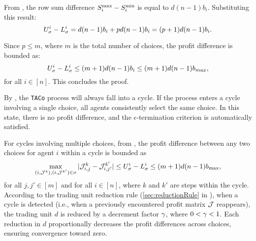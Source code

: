 \begin{customproof}
From , the row sum difference $S_i^{\mathrm{max}} - S_i^{\mathrm{min}}$ is equal to $d(n-1)b_i$. Substituting this result:
\begin{equation} \label{eq:priceDiff}
U_\sigma^i - L_\sigma^i = d(n-1)b_i + p d(n-1)b_i = (p+1)d(n-1)b_i.
\end{equation}

Since $p \leq m$, where $m$ is the total number of choices, the profit difference is bounded as:
\begin{equation} \label{eq:priceDiffUpper}
U_\sigma^i - L_\sigma^i \leq (m+1)d(n-1)b_i \leq (m+1)d(n-1)b_{max},
\end{equation}
for all $i\in[n]$. This concludes the proof.
\end{customproof}

\begin{customproof}
By , the \texttt{TACo} process will always fall into a cycle. If the process enters a cycle involving a single choice, all agents consistently select the same choice.  In this state, there is no profit difference, and the $\epsilon$-termination criterion is automatically satisfied. 

For cycles involving multiple choices, from , the profit difference between any two choices for agent $i$ within a cycle is bounded as
\begin{equation} \label{eq:profitBound}
\max_{(i,\mathcal{J}^k),(i,\mathcal{J}^{k'})\in\sigma} |\mathcal{J}^k_{i, j} - \mathcal{J}^{k'}_{i, j'}| \leq U_\sigma^i - L_\sigma^i \leq (m+1)d(n-1)b_{\max},
\end{equation}
for all $j, j' \in [m]$ and for all $i \in [n]$, where $k$ and $k'$ are steps within the cycle. According to the trading unit reduction rule (\cref{sec:reductionRule} in ), when a cycle is detected (i.e., when a previously encountered profit matrix $\mathcal{J}$ reappears), the trading unit $d$ is reduced by a decrement factor $\gamma$, where $0 < \gamma < 1$. Each reduction in $d$ proportionally decreases the profit differences across choices, ensuring convergence toward zero. 


\end{customproof}
